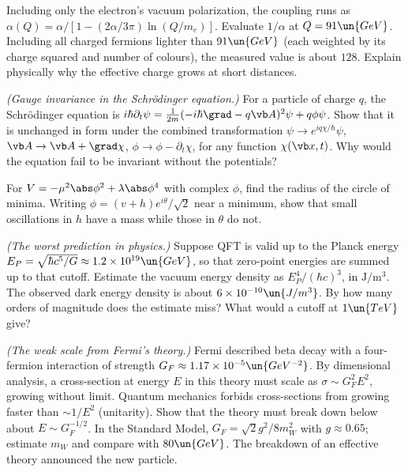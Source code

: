 \begin{problems}
 \label{prob:running} Including only the electron's vacuum polarization, the coupling runs as $\alpha(Q) = \alpha/[1 - (2\alpha/3\pi)\ln(Q/m_e)]$. Evaluate $1/\alpha$ at $Q = 91\un{GeV}$. Including all charged fermions lighter than $91\un{GeV}$ (each weighted by its charge squared and number of colours), the measured value is about $128$. Explain physically why the effective charge grows at short distances.

\core \emph{(Gauge invariance in the Schr\"odinger equation.)} For a particle of charge $q$, the Schr\"odinger equation is $i\hbar\partial_t\psi = \frac{1}{2m}(-i\hbar\grad - q\vb A)^2\psi + q\phi\psi$. Show that it is unchanged in form under the combined transformation $\psi\to e^{iq\chi/\hbar}\psi$, $\vb A\to\vb A + \grad\chi$, $\phi\to\phi - \partial_t\chi$, for any function $\chi(\vb x,t)$. Why would the equation fail to be invariant without the potentials?

 For $V = -\mu^2\abs\phi^2 + \lambda\abs\phi^4$ with complex $\phi$, find the radius of the circle of minima. Writing $\phi = (v + h)e^{i\theta}/\sqrt2$ near a minimum, show that small oscillations in $h$ have a mass while those in $\theta$ do not.

\core \label{prob:vacuum} \emph{(The worst prediction in physics.)} Suppose QFT is valid up to the Planck energy $E_P = \sqrt{\hbar c^5/G}\approx1.2\times10^{19}\un{GeV}$, so that zero-point energies are summed up to that cutoff. Estimate the vacuum energy density as $E_P^4/(\hbar c)^3$, in $\mathrm{J/m^3}$. The observed dark energy density is about $6\times10^{-10}\un{J/m^3}$. By how many orders of magnitude does the estimate miss? What would a cutoff at $1\un{TeV}$ give?

\core \emph{(The weak scale from Fermi's theory.)} Fermi described beta decay with a four-fermion interaction of strength $G_F\approx1.17\times10^{-5}\un{GeV^{-2}}$. By dimensional analysis, a cross-section at energy $E$ in this theory must scale as $\sigma\sim G_F^2E^2$, growing without limit. Quantum mechanics forbids cross-sections from growing faster than $\sim1/E^2$ (unitarity). Show that the theory must break down below about $E\sim G_F^{-1/2}$. In the Standard Model, $G_F = \sqrt2g^2/8m_W^2$ with $g\approx0.65$; estimate $m_W$ and compare with $80\un{GeV}$. The breakdown of an effective theory announced the new particle.
\end{problems}

\begin{reading}
\end{reading}

